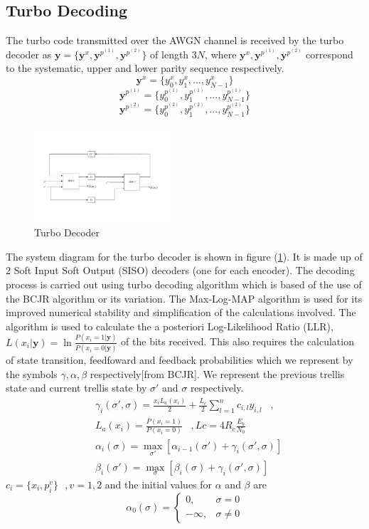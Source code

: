 \documentclass[technicalreport]{ieicej}
\begin{document}
 
 \subsection{Turbo Decoding}
 The turbo code transmitted over the AWGN channel is received by the turbo decoder as
  $\mathbf{y}=\{\mathbf{y}^x,\mathbf{y}^{p^{(1)}},\mathbf{y}^{p^{(2)}}\}$ 
  of length $3N$, where $\mathbf{y}^x,\mathbf{y}^{p^{(1)}},\mathbf{y}^{p^{(2)}}$
    correspond to the systematic, upper and lower parity sequence respectively.
    $$\mathbf{y}^x=\{y^x_0, y^x_1,...,y^x_{N-1}\}$$ 
    $$\mathbf{y}^{p^{(1)}}=\{y^{p^{(1)}}_0, y^{p^{(1)}}_1,...,y^{p^{(1)}}_{N-1} \}$$
 $$\mathbf{y}^{p^{(2)}}=\{y^{p^{(2)}}_0, y^{p^{(2)}}_1,...,y^{p^{(2)}}_{N-1}\}$$
\begin{figure}[h!]
\centering
		\includegraphics[width=0.45\textwidth]{D1.pdf}
		\caption{Turbo Decoder}
		\label{TDC}
		\end{figure}
	
 
 The system diagram for the turbo decoder is shown in figure (\ref{TDC}). It is made up of 2
 Soft Input Soft Output (SISO) decoders (one for each encoder). The decoding 
 process is carried out using turbo decoding algorithm which is based of the use of
 the BCJR algorithm or its variation.  The Max-Log-MAP algorithm is used 
 for its improved numerical stability and simplification of the calculations involved. 
 The algorithm is used to calculate the a posteriori Log-Likelihood Ratio (LLR),  
 $L(x_i|\mathbf{y})=\ln \frac{P(x_i=1|\mathbf{y})}{P(x_i=0|\mathbf{y})}$ 
 of the bits received. This also requires
 the calculation of state transition, feedfoward and feedback probabilities which we
 represent by the symbols $\gamma,\alpha, \beta $ respectively[from BCJR]. We 
 represent the previous trellis state and current trellis state by $\sigma'$ and $\sigma$ 
 respectively.
\begin{equation}
\begin{split}
&\gamma_i(\sigma',\sigma)=
\frac{x_i L_a (x_i)}{2}+
\frac{L_c}{2}\sum_{l=1}^{n} c_{i,l}y_{i,l}\,\,\,\,\, ,\\&L_a(x_i) =\frac{P(x_i=1)}{P(x_i=0)}
\,\,\,\,\, ,Lc=4R_c\frac{E_b}{N_0}\\
&\alpha_i(\sigma)=\max_{\sigma'}[\alpha_{i-1}(\sigma')+\gamma_i(\sigma',\sigma)]\\
&\beta_i(\sigma')=\max_{\sigma}[\beta_{i}(\sigma)+\gamma_i(\sigma',\sigma)]
\end{split}
\label{abc}
\end{equation}
$c_i=\{x_i,p^{v}_i\}\,\,\,\, ,v=1,2$ and the initial values for $\alpha$ and $\beta$ are
\[
    \alpha_0(\sigma)= 
\begin{cases}
   0,& \sigma= 0\\        -\infty,              &  \sigma \neq 0
\end{cases}
\]
\end{document}
